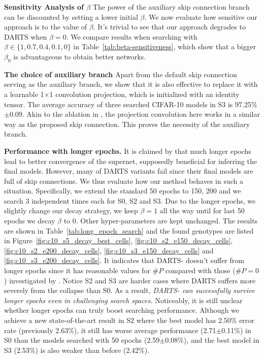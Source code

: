 \documentclass{article} \usepackage{iclr2021_conference,times}
\begin{document}
\textbf{Sensitivity Analysis of $\beta$}\quad
The power of the auxiliary skip connection branch can be discounted by setting a lower initial $\beta$. We now evaluate how sensitive our approach is to the value of $\beta$. It's trivial to see that our approach degrades to DARTS when $\beta = 0$. We compare results when searching with $\beta \in \{1,0.7,0.4,0.1,0\}$ in Table~\ref{tab:beta-sensitiveness}, which show that a bigger $\beta_0$ is advantageous to obtain better networks.

\textbf{The choice of auxiliary branch}
Apart from the default skip connection serving as the auxiliary branch, we show that it is also effective to replace it with a learnable 1$\times$1 convolution projection, which is initialized with an identity tensor. The average accuracy of three searched CIFAR-10 models in S3 is 97.25\%$\pm$0.09. Akin to the ablation in \cite{he2016deep}, the projection convolution here works in a similar way as the proposed skip connection. This proves the necessity of the auxiliary branch.

\textbf{Performance with longer epochs. } It is claimed by  \cite{bi2019stabilizing} that much longer epochs lead to better convergence of the supernet, supposedly beneficial for inferring the final models. However, many of DARTS variants fail since their final models are full of skip connections.  We thus evaluate how our method behaves in such a situation.  Specifically, we extend the standard 50 epochs to 150, 200 and we search 3 independent times each for S0, S2 and S3. Due to the longer epochs, we slightly change our decay strategy, we keep $\beta=1$ all the way until for last 50 epochs we decay $\beta$ to 0. Other hyper-parameters are kept unchanged. The results are shown in Table~\ref{tab:long_epoch_search} and the found genotypes are listed in Figure~\ref{fig:c10_s5_decay_best_cells}, \ref{fig:c10_s2_e150_decay_cells}, \ref{fig:c10_s2_e200_decay_cells}, \ref{fig:c10_s3_e150_decay_cells} and \ref{fig:c10_s3_e200_decay_cells}. It indicates that DARTS- doesn't suffer from longer epochs since it has reasonable values for $\#P$ compared with those ($\#P=0$) investigated by \cite{bi2019stabilizing}. Notice S2 and S3 are harder cases where DARTS suffers more severely from the collapse than S0. As a result, \emph{DARTS- can successfully survive longer epochs even in challenging search spaces.} Noticeably, it is still unclear whether longer epochs can truly boost searching performance.  Although we achieve a new state-of-the-art result in S2 where the best model has 2.50\% error rate (previously 2.63\%), it still has worse average performance (2.71$\pm$0.11\%) in S0 than the models searched with 50 epochs (2.59$\pm$0.08\%), and the best model in S3 (2.53\%) is also weaker than before (2.42\%).
\end{document}
